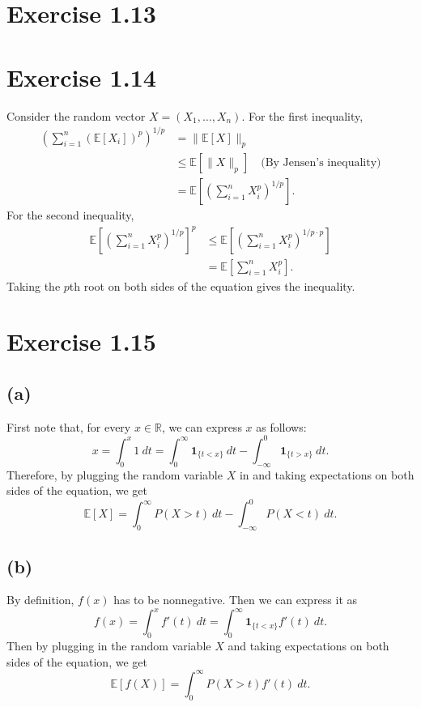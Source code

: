 \newpage
\section*{Exercise 1.13}


\newpage
\section*{Exercise 1.14}
Consider the random vector $X = (X_1, \dots, X_n)$. For the first inequality, 
\begin{align*}
	\left( \sum_{i = 1}^{n} (\mathbb{E}\left[ X_i \right])^p \right)^{1/p} 
	&= \lVert \mathbb{E}\left[ X \right] \rVert_{p} \\
	&\leq \mathbb{E}\left[ \lVert X \rVert_{p} \right] \quad \text{(By Jensen's inequality)} \\
	&= \mathbb{E}\left[ \left( \sum_{i = 1}^{n} X_i^p \right)^{1/p} \right].
\end{align*}
For the second inequality, 
\begin{align*}
	\mathbb{E}\left[ \left( \sum_{i = 1}^{n} X_i^p \right)^{1/p} \right]^p 
	&\leq \mathbb{E}\left[ \left( \sum_{i = 1}^{n} X_i^p \right)^{1/p \cdot p} \right] \\
	&= \mathbb{E}\left[ \sum_{i = 1}^{n} X_i^p \right].
\end{align*}
Taking the $p$th root on both sides of the equation gives the inequality.


\newpage
\section*{Exercise 1.15}
\subsection*{(a)}
First note that, for every $x \in \mathbb{R}$, we can express $x$ as follows: 
\[ x = \int_{0}^{x} 1 \ dt = \int_{0}^{\infty} \mathbf{1}_{\{ t < x \}} \ dt 
- \int_{-\infty}^{0} \mathbf{1}_{\{ t > x \}} \ dt. \]
Therefore, by plugging the random variable $X$ in and taking expectations on both sides of the equation, we get 
\[ \mathbb{E}\left[ X \right] = \int_{0}^{\infty} P(X > t) \ dt - \int_{-\infty}^{0} P(X < t) \ dt. \]

\subsection*{(b)}
By definition, $f(x)$ has to be nonnegative. Then we can express it as 
\[ f(x) = \int_{0}^{x} f'(t) \ dt = \int_{0}^{\infty} \mathbf{1}_{\{ t < x \}} f'(t) \ dt. \]
Then by plugging in the random variable $X$ and taking expectations on both sides of the equation, we get 
\[ \mathbb{E}\left[ f(X) \right] = \int_{0}^{\infty} P(X > t)f'(t) \ dt. \]


